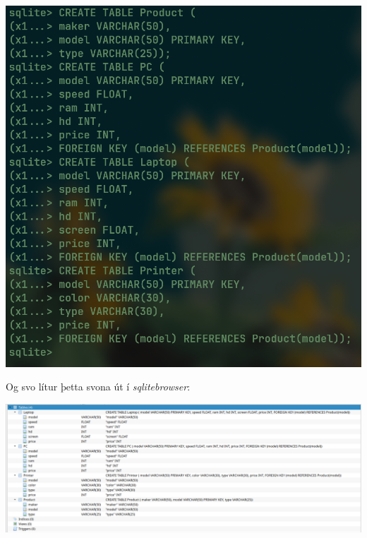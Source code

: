 \documentclass{article}
\begin{document}
\begin{center}
	\includegraphics[scale=0.3]{db.png}
\end{center}

Og svo lítur þetta svona út í \textit{sqlitebrowser}:

\begin{center}
	\includegraphics[scale=0.275]{dbbrowser.png}
\end{center}
\end{document}
